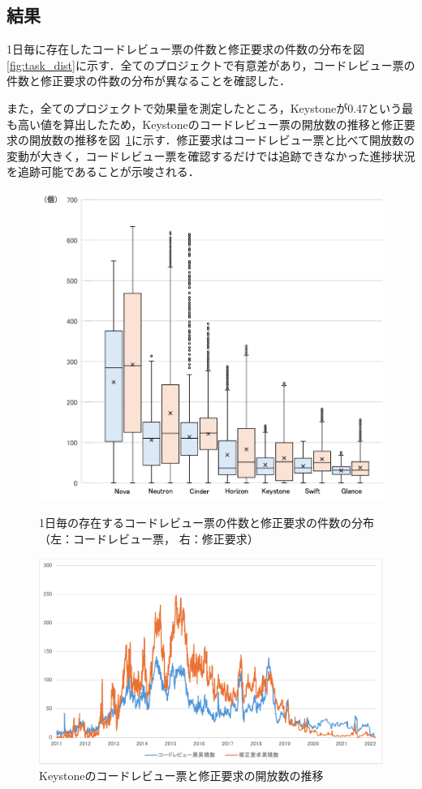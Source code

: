 \documentclass[T,J]{fose} %
\begin{document}
\subsection{結果}
1日毎に存在したコードレビュー票の件数と修正要求の件数の分布を図\ref{fig:task_dist}に示す．全てのプロジェクトで有意差があり，コードレビュー票の件数と修正要求の件数の分布が異なることを確認した．

また，全てのプロジェクトで効果量を測定したところ，Keystoneが0.47という最も高い値を算出したため，Keystoneのコードレビュー票の開放数の推移と修正要求の開放数の推移を図~\ref{fig:task_trans}に示す．修正要求はコードレビュー票と比べて開放数の変動が大きく，コードレビュー票を確認するだけでは追跡できなかった進捗状況を追跡可能であることが示唆される．

\begin{figure}[t]
\centerline{\includegraphics[width=1.0\linewidth]{Kawasaki_fig/task_dist.pdf}}
\caption{1日毎の存在するコードレビュー票の件数と修正要求の件数の分布（左：コードレビュー票， 右：修正要求）}
\label{fig:task_dist}

\vspace{2mm}

\centerline{\includegraphics[width=1.0\linewidth]{Kawasaki_fig/task_trans.pdf}}
\caption{Keystoneのコードレビュー票と修正要求の開放数の推移}
\label{fig:task_trans}
\end{figure}
\end{document}
